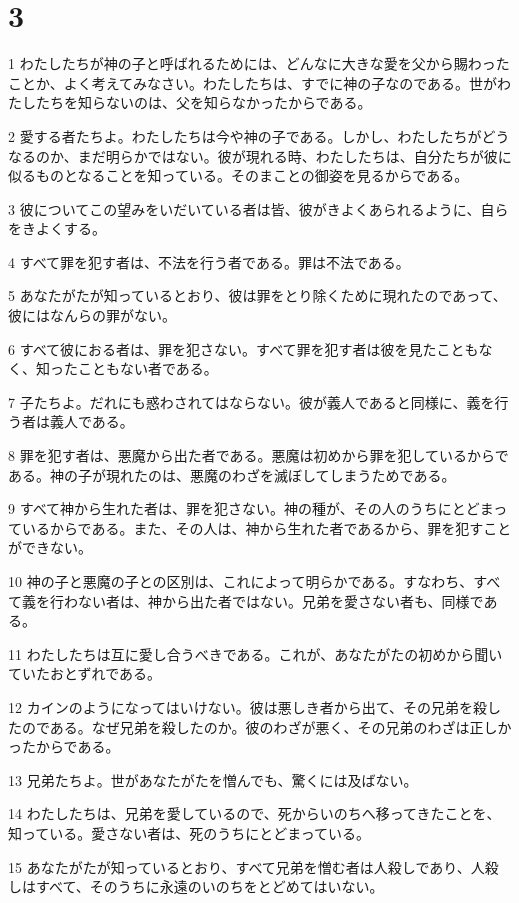 \chapter{3}

\par 1 わたしたちが神の子と呼ばれるためには、どんなに大きな愛を父から賜わったことか、よく考えてみなさい。わたしたちは、すでに神の子なのである。世がわたしたちを知らないのは、父を知らなかったからである。
\par 2 愛する者たちよ。わたしたちは今や神の子である。しかし、わたしたちがどうなるのか、まだ明らかではない。彼が現れる時、わたしたちは、自分たちが彼に似るものとなることを知っている。そのまことの御姿を見るからである。
\par 3 彼についてこの望みをいだいている者は皆、彼がきよくあられるように、自らをきよくする。
\par 4 すべて罪を犯す者は、不法を行う者である。罪は不法である。
\par 5 あなたがたが知っているとおり、彼は罪をとり除くために現れたのであって、彼にはなんらの罪がない。
\par 6 すべて彼におる者は、罪を犯さない。すべて罪を犯す者は彼を見たこともなく、知ったこともない者である。
\par 7 子たちよ。だれにも惑わされてはならない。彼が義人であると同様に、義を行う者は義人である。
\par 8 罪を犯す者は、悪魔から出た者である。悪魔は初めから罪を犯しているからである。神の子が現れたのは、悪魔のわざを滅ぼしてしまうためである。
\par 9 すべて神から生れた者は、罪を犯さない。神の種が、その人のうちにとどまっているからである。また、その人は、神から生れた者であるから、罪を犯すことができない。
\par 10 神の子と悪魔の子との区別は、これによって明らかである。すなわち、すべて義を行わない者は、神から出た者ではない。兄弟を愛さない者も、同様である。
\par 11 わたしたちは互に愛し合うべきである。これが、あなたがたの初めから聞いていたおとずれである。
\par 12 カインのようになってはいけない。彼は悪しき者から出て、その兄弟を殺したのである。なぜ兄弟を殺したのか。彼のわざが悪く、その兄弟のわざは正しかったからである。
\par 13 兄弟たちよ。世があなたがたを憎んでも、驚くには及ばない。
\par 14 わたしたちは、兄弟を愛しているので、死からいのちへ移ってきたことを、知っている。愛さない者は、死のうちにとどまっている。
\par 15 あなたがたが知っているとおり、すべて兄弟を憎む者は人殺しであり、人殺しはすべて、そのうちに永遠のいのちをとどめてはいない。
